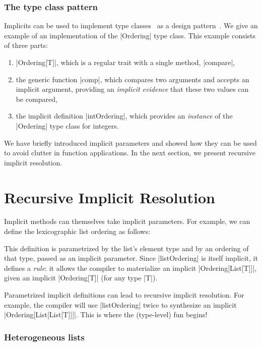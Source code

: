 \subsubsection{The type class pattern}

Implicits can be used to implement type classes~\citep{wadler1989how} as a design pattern~\citep{oliveira2010type}.
We give an example of an implementation of the |Ordering| type class.
This example consists of three parts:

\begin{enumerate}
  \item |Ordering[T]|, which is a regular trait with a single method, |compare|,
  \item the generic function |comp|, which compares two arguments and accepts an implicit argument, providing an \emph{implicit evidence} that these two values can be compared,
  \item the implicit definition |intOrdering|, which provides an \emph{instance} of the |Ordering| type class for integers.
\end{enumerate}

\ordExample

We have briefly introduced implicit parameters and showed how they can be used to avoid clutter in function applications.
In the next section, we present recursive implicit resolution.

\section{Recursive Implicit Resolution}

Implicit methods can themselves take implicit parameters.
For example, we can define the lexicographic list ordering as follows:

\ordListExample

\noindent
This definition is parametrized by the list's element type and by an ordering of that type, passed as an implicit parameter.
Since |listOrdering| is itself implicit, it defines a \emph{rule}: it allows the compiler to materialize an implicit |Ordering[List[T]]|, given an implicit |Ordering[T]| (for any type |T|).

Parametrized implicit definitions can lead to recursive implicit resolution. For example, the compiler will use |listOrdering| twice to synthesize an implicit |Ordering[List[List[T]]]|.
This is where the (type-level) fun begins!

\subsubsection{Heterogeneous lists}

